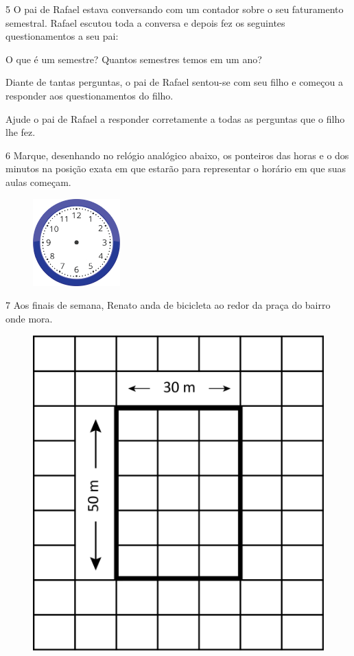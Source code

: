 \num{5} O pai de Rafael estava conversando com um contador sobre o seu
faturamento semestral. Rafael escutou toda a conversa e depois fez os
seguintes questionamentos a seu pai:

O que é um semestre? 
Quantos semestres temos em um ano?

Diante de tantas perguntas, o pai de Rafael sentou-se com seu filho e
começou a responder aos questionamentos do filho.

Ajude o pai de Rafael a responder corretamente a todas as perguntas que o filho lhe fez.


\pagebreak
\num{6} Marque, desenhando no relógio analógico abaixo, os ponteiros das horas e o dos
minutos na posição exata em que estarão para representar o horário em que
suas aulas começam.

\begin{figure}[htpb!]
\centering
\includegraphics[width=0.3\textwidth]{./media/image54b.png}
\end{figure}


\num{7} Aos finais de semana, Renato anda de bicicleta ao redor da praça do bairro onde mora.

\begin{figure}[htpb!]
\centering
\includegraphics[width=.4\textwidth]{./media/image55.png}
\end{figure}

